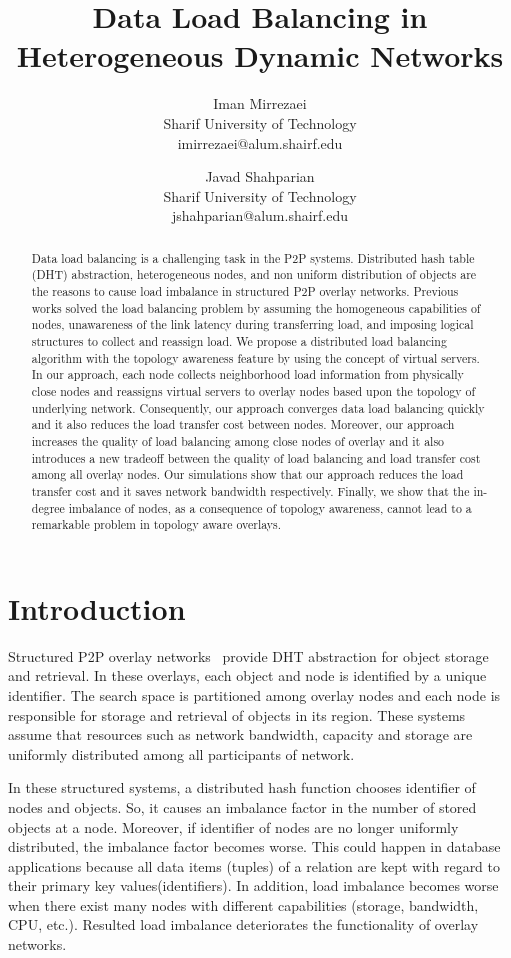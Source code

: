 \documentclass {article}
\title{Data Load Balancing in Heterogeneous Dynamic Networks}
\author{Iman Mirrezaei\\
	Sharif University of Technology \\ imirrezaei@alum.shairf.edu \\
	\and 
	Javad Shahparian \\
	Sharif University of Technology \\ jshahparian@alum.shairf.edu \\}
\date{ }
\begin{document}
\maketitle
\begin {abstract}
  Data load balancing is a challenging task in the P2P systems.
 Distributed hash table (DHT) abstraction, heterogeneous nodes, and non uniform distribution of objects are the reasons to cause load imbalance in structured P2P overlay networks.
 Previous works solved the load balancing problem by assuming  the homogeneous capabilities of nodes, unawareness of the link latency during transferring load, and imposing logical structures to collect and reassign load. 
 We propose a distributed load balancing algorithm with the topology awareness  feature by using the concept of virtual servers. 
 In our approach, each node collects neighborhood load information from physically close  nodes  and  reassigns  virtual servers to overlay nodes based upon the topology of underlying network.
 Consequently, our approach converges data load balancing quickly and it also reduces the load transfer cost between nodes.
 Moreover, our approach increases the quality of load balancing  among  close nodes of overlay and it also introduces a new tradeoff between the quality of load balancing and load transfer cost among all overlay nodes. 
 Our simulations show that our approach reduces the load transfer cost and it saves network bandwidth respectively.
 Finally, we show that the in-degree imbalance of nodes, as a consequence of  topology awareness, cannot lead to a remarkable problem in topology aware overlays.
\end {abstract}



\section{Introduction} \label{Inroduction}
Structured P2P overlay networks~\cite{pastry,CAN,chord} provide  DHT abstraction for object storage and retrieval. In these overlays, each object  and node is identified by a  unique identifier. The search space is partitioned among overlay nodes and each node is responsible for storage and retrieval of objects in its region. These systems assume that resources such as network bandwidth, capacity and  storage are uniformly distributed among all participants of network.

In these structured systems, a distributed hash function chooses identifier of nodes and objects. So, it causes an  imbalance factor in the number of stored objects at a node. Moreover, if identifier of nodes are no longer uniformly distributed, the imbalance factor  becomes worse. This could happen in database applications because all data items (tuples) of a relation are kept with regard to  their primary key values(identifiers). In addition, load imbalance becomes worse  when there exist many nodes with different capabilities (storage, bandwidth, CPU, etc.). Resulted load imbalance deteriorates the functionality of overlay networks.
\end{document}
